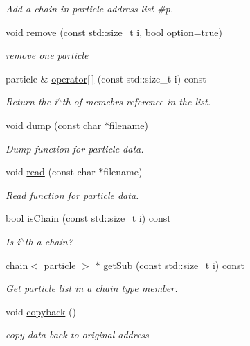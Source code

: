 \begin{DoxyCompactItemize}
\begin{DoxyCompactList}\small\item\em Add a chain in particle address list \#p. \end{DoxyCompactList}\item 
void \hyperlink{classARC_1_1chainlist_acfd8eb70053894bd0883a77d6c111932}{remove} (const std\+::size\+\_\+t i, bool option=true)
\begin{DoxyCompactList}\small\item\em remove one particle \end{DoxyCompactList}\item 
particle \& \hyperlink{classARC_1_1chainlist_a41817869f9e9063354496cdf92b54523}{operator\mbox{[}$\,$\mbox{]}} (const std\+::size\+\_\+t i) const 
\begin{DoxyCompactList}\small\item\em Return the i$^\wedge$th of memebr\textquotesingle{}s reference in the list. \end{DoxyCompactList}\item 
void \hyperlink{classARC_1_1chainlist_a2dd5af449a9e85f487e1a2332b64060f}{dump} (const char $\ast$filename)
\begin{DoxyCompactList}\small\item\em Dump function for particle data. \end{DoxyCompactList}\item 
void \hyperlink{classARC_1_1chainlist_aea5f83e036a5e4649158f13cf341a31e}{read} (const char $\ast$filename)
\begin{DoxyCompactList}\small\item\em Read function for particle data. \end{DoxyCompactList}\item 
bool \hyperlink{classARC_1_1chainlist_aaf7a9437ca32719b31dd52f18c8414a3}{is\+Chain} (const std\+::size\+\_\+t i) const 
\begin{DoxyCompactList}\small\item\em Is i$^\wedge$th a chain? \end{DoxyCompactList}\item 
\hyperlink{classARC_1_1chain}{chain}$<$ particle $>$ $\ast$ \hyperlink{classARC_1_1chainlist_a96bce5ad37cd15833f99ee93361e07ea}{get\+Sub} (const std\+::size\+\_\+t i) const 
\begin{DoxyCompactList}\small\item\em Get particle list in a chain type member. \end{DoxyCompactList}\item 
void \hyperlink{classARC_1_1chainlist_a2249db484a34384214c4fbba8d4d19ad}{copyback} ()
\begin{DoxyCompactList}\small\item\em copy data back to original address \end{DoxyCompactList}\end{DoxyCompactItemize}


